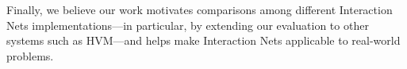 \begin{enumerate}
\end{enumerate}

Finally, we believe our work motivates comparisons among different Interaction Nets implementations---in particular, by extending our evaluation to other systems such as HVM---and helps make Interaction Nets applicable to real-world problems.